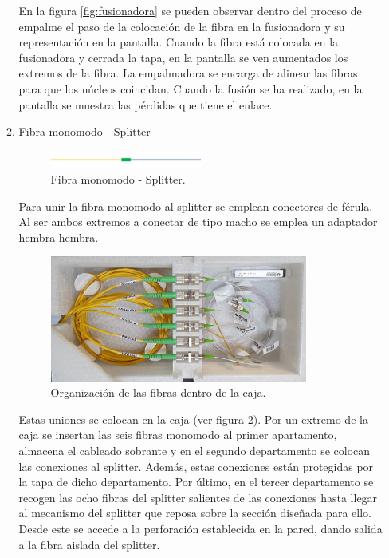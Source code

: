 \begin{itemize}
\begin{enumerate}
	En la figura \ref{fig:fusionadora} se pueden observar dentro del proceso de empalme el paso de la colocación de la fibra en la fusionadora y su representación en la pantalla. %
	Cuando la fibra está colocada en la fusionadora y cerrada la tapa, en la pantalla se ven aumentados los extremos de la fibra. La empalmadora se encarga de alinear las fibras para que los núcleos coincidan. Cuando la fusión se ha realizado, en la pantalla se muestra las pérdidas que tiene el enlace.  
	

	
	\item \underline{Fibra monomodo - Splitter}
	
	\begin{figure}[H]
		\centering
		\includegraphics[width=0.5\textwidth]{./img/union2}
		\caption{Fibra monomodo - Splitter.} 
		\label{fig:union2}
	\end{figure}  
	
	Para unir la fibra monomodo al splitter se emplean conectores de férula. Al ser ambos extremos a conectar de tipo macho se emplea un adaptador hembra-hembra. 
	
	\begin{figure}[H]
		\centering
		\includegraphics[width=0.85\textwidth]{./img/cajaOrden}
		\caption{Organización de las fibras dentro de la caja.} 
		\label{fig:CajaOrden}
	\end{figure}  
	
	Estas uniones se colocan en la caja (ver figura \ref{fig:CajaOrden}). Por un extremo de la caja se insertan las seis fibras monomodo al primer apartamento, almacena el cableado sobrante y en el segundo departamento se colocan las conexiones al splitter. Además, estas conexiones están protegidas por la tapa de dicho departamento. Por último, en el tercer departamento se recogen las ocho fibras del splitter salientes de las conexiones hasta llegar al mecanismo del splitter que reposa sobre la sección diseñada para ello. Desde este se accede a la perforación establecida en la pared, dando salida a la fibra aislada del splitter.


\end{enumerate}
\end{itemize}
